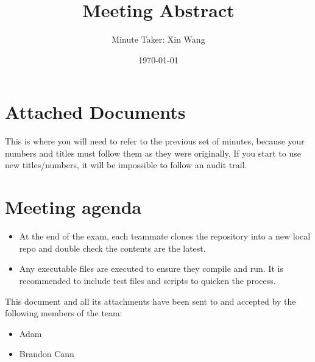 \documentclass[a4paper]{article}
\author{Minute Taker: Xin Wang}
\title{Meeting Abstract}
\date{\today}
\begin{document}
\maketitle
\section{Attached Documents} 
This is where you will need to refer to the previous set of minutes, because your numbers and titles must follow them as they were originally. If you start to use new titles/numbers, it will be impossible to follow an audit trail.

\maketitle
\section{Meeting agenda} 
\begin{itemize}
    \item At the end of the exam, each teammate clones the repository into a new local repo and double check the contents are the latest.
    \item Any executable files are executed to ensure they compile and run. It is recommended to include test files and scripts to quicken the process.
\end{itemize}




\vspace*{\fill}
\begin{center}
This document and all its attachments have been sent to and accepted by the following members of the team:
\begin{itemize}
\item Adam
\item Brandon Cann
\end{itemize}
\end{center}
\end{document}
